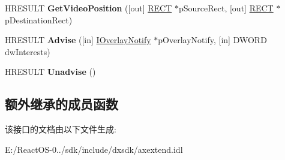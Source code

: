 \begin{DoxyCompactItemize}
\item 
\mbox{\label{interface_i_overlay_a04d59853a3ce020bd617a81bffb8ed7b}} 
H\+R\+E\+S\+U\+LT {\bfseries Get\+Video\+Position} (\mbox{[}out\mbox{]} \hyperlink{structtag_r_e_c_t}{R\+E\+CT} $\ast$p\+Source\+Rect, \mbox{[}out\mbox{]} \hyperlink{structtag_r_e_c_t}{R\+E\+CT} $\ast$p\+Destination\+Rect)
\item 
\mbox{\label{interface_i_overlay_a87edbeae5c6126a9a033397c2821a9e6}} 
H\+R\+E\+S\+U\+LT {\bfseries Advise} (\mbox{[}in\mbox{]} \hyperlink{interface_i_overlay_notify}{I\+Overlay\+Notify} $\ast$p\+Overlay\+Notify, \mbox{[}in\mbox{]} D\+W\+O\+RD dw\+Interests)
\item 
\mbox{\label{interface_i_overlay_a116da1e4bc124e99d9a4eadbd0a60248}} 
H\+R\+E\+S\+U\+LT {\bfseries Unadvise} ()
\end{DoxyCompactItemize}
\subsection*{额外继承的成员函数}


该接口的文档由以下文件生成\+:\begin{DoxyCompactItemize}
\item 
E\+:/\+React\+O\+S-\/0../sdk/include/dxsdk/axextend.\+idl\end{DoxyCompactItemize}
